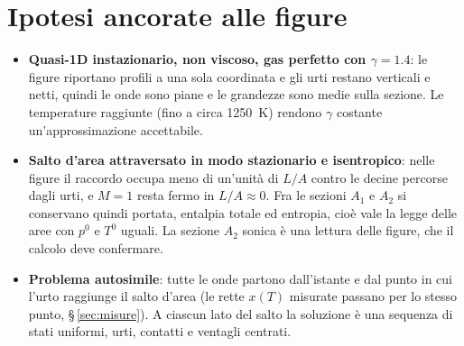 \documentclass[11pt,a4paper]{article}
\begin{document}
\section{Ipotesi ancorate alle figure}
\begin{itemize}
  \item \textbf{Quasi-1D instazionario, non viscoso, gas perfetto con $\gamma=\num{1.4}$}: le figure riportano
    profili a una sola coordinata e gli urti restano verticali e netti, quindi le onde sono piane e le grandezze
    sono medie sulla sezione. Le temperature raggiunte (fino a circa \SI{1250}{K}) rendono $\gamma$ costante
    un'approssimazione accettabile.
  \item \textbf{Salto d'area attraversato in modo stazionario e isentropico}: nelle figure il raccordo occupa
    meno di un'unità di $L/A$ contro le decine percorse dagli urti, e $M=1$ resta fermo in $L/A\approx0$. Fra
    le sezioni $A_1$ e $A_2$ si conservano quindi portata, entalpia totale ed entropia, cioè vale la legge delle
    aree con $p^0$ e $T^0$ uguali. La sezione $A_2$ sonica è una lettura delle figure, che il calcolo deve
    confermare.
  \item \textbf{Problema autosimile}: tutte le onde partono dall'istante e dal punto in cui l'urto raggiunge il
    salto d'area (le rette $x(T)$ misurate passano per lo stesso punto, \S\,\ref{sec:misure}). A ciascun lato del
    salto la soluzione è una sequenza di stati uniformi, urti, contatti e ventagli centrati.
\end{itemize}

\end{document}
